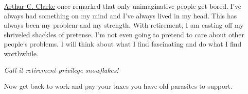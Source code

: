 \href{https://www.clarkefoundation.org/}{Arthur C. Clarke} once remarked
that only unimaginative people get bored. I've always had something on
my mind and I've always lived in my head. This has always been my
problem and my strength. With retirement, I am casting off my shriveled
shackles of pretense. I'm not even going to pretend to care about other
people's problems. I will think about what I find fascinating and do
what I find worthwhile.

\emph{Call it retirement privilege snowflakes!}

Now get back to work and pay your taxes you have old parasites to
support.



%
 

